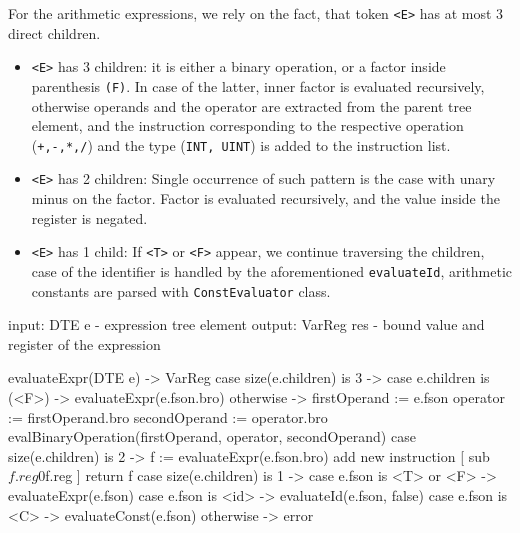 \newpage
For the arithmetic expressions, we rely on the fact, that token \verb+<E>+ has at most 3 direct children.
\begin{itemize}
\item \verb+<E>+ has 3 children: it is either a binary operation, or a factor inside parenthesis \verb+(F)+.
In case of the latter, inner factor is evaluated recursively, otherwise operands and the operator are extracted from the
parent tree element, and the instruction corresponding to the respective operation (\verb_+,-,*,/_) and the type (\verb+INT, UINT+)
is added to the instruction list.
\item \verb+<E>+ has 2 children: Single occurrence of such pattern is the case with unary minus on the factor. Factor is
evaluated recursively, and the value inside the register is negated.
\item \verb+<E>+ has 1 child: If \verb+<T>+ or \verb+<F>+ appear, we continue traversing the children, case of the
identifier is handled by the aforementioned \verb+evaluateId+, arithmetic constants are parsed with \verb+ConstEvaluator+ class.
\end{itemize}
\begin{codeblock}
input: DTE e - expression tree element
output: VarReg res - bound value and register of the expression

evaluateExpr(DTE e) -> VarReg {
    case size(e.children) is 3 -> {
        case e.children is (<F>) -> evaluateExpr(e.fson.bro)
        otherwise -> {
            firstOperand := e.fson
            operator := firstOperand.bro
            secondOperand := operator.bro
            evalBinaryOperation(firstOperand, operator, secondOperand)
        }
    }
    case size(e.children) is 2 -> {
        f := evaluateExpr(e.fson.bro)
        add new instruction [ sub $f.reg 0 $f.reg ]
        return f
    }
    case size(e.children) is 1 -> {
        case e.fson is <T> or <F> -> evaluateExpr(e.fson)
        case e.fson is <id> -> evaluateId(e.fson, false)
        case e.fson is <C> -> evaluateConst(e.fson)
    }
    otherwise -> error
}
\end{codeblock}

